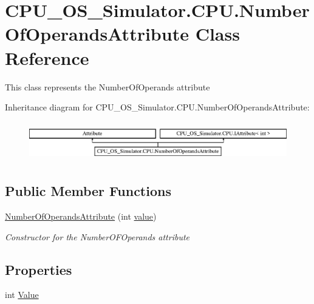 \hypertarget{class_c_p_u___o_s___simulator_1_1_c_p_u_1_1_number_of_operands_attribute}{}\section{C\+P\+U\+\_\+\+O\+S\+\_\+\+Simulator.\+C\+P\+U.\+Number\+Of\+Operands\+Attribute Class Reference}
\label{class_c_p_u___o_s___simulator_1_1_c_p_u_1_1_number_of_operands_attribute}


This class represents the Number\+Of\+Operands attribute  


Inheritance diagram for C\+P\+U\+\_\+\+O\+S\+\_\+\+Simulator.\+C\+P\+U.\+Number\+Of\+Operands\+Attribute\+:\begin{figure}[H]
\begin{center}
\leavevmode
\includegraphics[height=1.733746cm]{class_c_p_u___o_s___simulator_1_1_c_p_u_1_1_number_of_operands_attribute}
\end{center}
\end{figure}
\subsection*{Public Member Functions}
\begin{DoxyCompactItemize}
\item 
\hyperlink{class_c_p_u___o_s___simulator_1_1_c_p_u_1_1_number_of_operands_attribute_a1976902af3b6dc92e16724d83937816e}{Number\+Of\+Operands\+Attribute} (int \hyperlink{class_c_p_u___o_s___simulator_1_1_c_p_u_1_1_number_of_operands_attribute_a23e7e9d6f0e3af1c7deddce153d13965}{value})
\begin{DoxyCompactList}\small\item\em Constructor for the Number\+O\+F\+Operands attribute \end{DoxyCompactList}\end{DoxyCompactItemize}
\subsection*{Properties}
\begin{DoxyCompactItemize}
\item 
int \hyperlink{class_c_p_u___o_s___simulator_1_1_c_p_u_1_1_number_of_operands_attribute_a00873634b211bcf2fd8b1425aa5143d6}{Value}
\end{DoxyCompactItemize}
